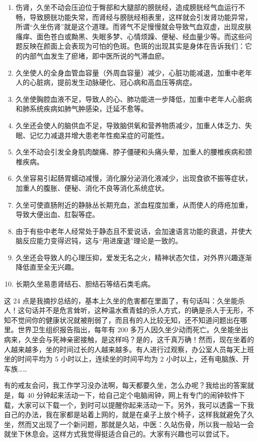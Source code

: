 \documentclass{ctexart}
\begin{document}
\begin{enumerate}
    \item 伤肾，久坐不动会压迫位于臀部和大腿部的膀胱经，造成膀胱经气血运行不畅，导致膀胱功能失常，而肾经与膀胱经相表里，这样就会引发肾功能异常，所谓“久坐伤肾”就是这个道理。而肾气不足慢慢就会导致气血双虚，出现皮肤瘙痒、面色苍白或黝黑、失眠多梦、心情烦躁、便秘、经血量少等。而这些问题反映在颜面上会表现为可怕的色斑。色斑的出现其实是身体在告诉我们：它的内部气血发生了瘀堵，即中医所说的气滞血瘀。
    \item 久坐使人的全身血管血容量（外周血容量）减少，心脏功能减退，加重中老年人的心脏病，提前发生动脉硬化、冠心病和高血压等病症。
    \item 久坐使胸腔血液不足，导致人的心、肺功能进一步降低，加重中老年人心脏病和肺系统疾病如肺气肿感染，迁延不愈等。
    \item 久坐还会使人的脑供血不足，导致脑供氧和营养物质减少，加重人体乏力、失眠、记忆力减退并增大患老年性痴呆症的可能性。
    \item 久坐不动会引发全身肌肉酸痛、脖子僵硬和头痛头晕，加重人的腰椎疾病和颈椎疾病。
    \item 久坐容易引起肠胃蠕动减慢，消化腺分泌消化液减少，出现食欲不振等症状，加重人的腹胀、便秘、消化不良等消化系统症状。
    \item 久坐可使直肠附近的静脉丛长期充血，淤血程度加重，从而使人的痔疮加重，导致大便出血、肛裂等症。
    \item 由于有些中老年人经常处于静态且不爱说话，会加速语言功能的衰退，并使大脑反应能力变得迟钝，这与“用进废退”理论是一致的。
    \item 久坐还会导致人的心理压抑，爱发无名之火，精神状态欠佳，对外界兴趣逐渐降低直至全无兴趣。
    \item 长期久坐易患肾结石、胆结石等结石类毛病。
\end{enumerate}

这 24 点是我摘抄总结的，基本上久坐的危害都在里面了，有句话叫：久坐能杀人！这句话并不是危言耸听，这种温水煮青蛙的杀人方式，的确是杀人于无形，不知不觉间你的健康状况就被削弱了，而且有的人比较无知，还不知道问题出在哪里。世界卫生组织报告指出，每年有 200 多万人因久坐少动而死亡。久坐能坐出病来，久坐会与死神亲密接触，是这样吗？是的，这千真万确！然而，现在坐着的人越来越多，坐的时间过长的人越来越多。有人进行过观察，办公室人员每天上班坐的时间平均为 5 小时以上，连续坐的时间平均为 2 小时以上，还有电脑族、开车族……

有的戒友会问，我工作学习没办法啊，每天都要久坐，怎么办呢？我给出的答案就是，每 40 分钟起来活动一下，给自己定个电脑闹钟，网上有专门的闹钟软件下载，大家可以下载一个，到时可以提醒你起来活动一下。另外，我可以透露一下我自己的办法，我在家都是站着上网的，就是在桌子上放个椅子，这样我就避免了久坐，然而又出现了一个新问题，那就是久站，中医：久站伤骨，所以我一般站一会就坐下休息会。这样方式我觉得挺适合自己的。大家有兴趣也可以尝试下。
\end{document}
